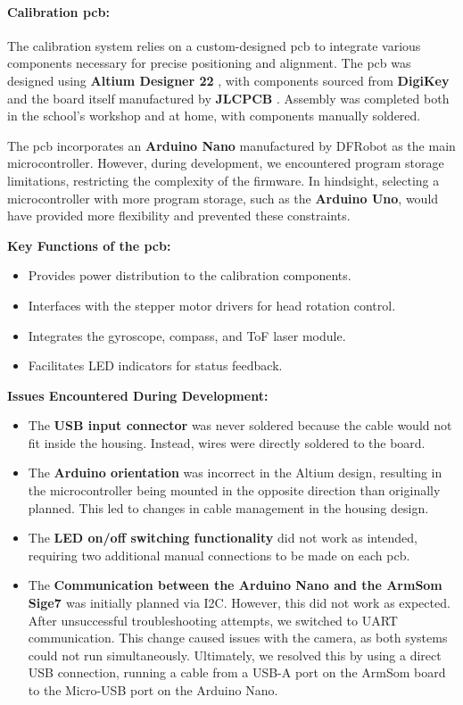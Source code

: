 \paragraph{Calibration \acrshort{pcb}:}
The calibration system relies on a custom-designed \acrshort{pcb} to integrate various components necessary for precise positioning and alignment. The \acrshort{pcb} was designed using \textbf{Altium Designer 22} \cite{altium_designer_22}, with components sourced from \textbf{DigiKey} \cite{digikey} and the board itself manufactured by \textbf{JLCPCB} \cite{jlcpcb}. Assembly was completed both in the school’s workshop and at home, with components manually soldered.

The \acrshort{pcb} incorporates an \textbf{Arduino Nano} manufactured by DFRobot \cite{arduino_nano_dfrobot} as the main microcontroller. However, during development, we encountered program storage limitations, restricting the complexity of the firmware. In hindsight, selecting a microcontroller with more program storage, such as the \textbf{Arduino Uno}, would have provided more flexibility and prevented these constraints.

\textbf{Key Functions of the \acrshort{pcb}:}
\begin{itemize}
	\item Provides power distribution to the calibration components.
	\item Interfaces with the stepper motor drivers for head rotation control.
	\item Integrates the gyroscope, compass, and ToF laser module.
	\item Facilitates LED indicators for status feedback.
\end{itemize}

\textbf{Issues Encountered During Development:}
\begin{itemize}
	\item The \textbf{USB input connector} was never soldered because the cable would not fit inside the housing. Instead, wires were directly soldered to the board.
	\item The \textbf{Arduino orientation} was incorrect in the Altium design, resulting in the microcontroller being mounted in the opposite direction than originally planned. This led to changes in cable management in the housing design.
	\item The \textbf{LED on/off switching functionality} did not work as intended, requiring two additional manual connections to be made on each \acrshort{pcb}.
	\item The \textbf{Communication between the Arduino Nano \cite{arduino_nano_dfrobot} and the ArmSom Sige7 \cite{armsom_sige7}} was initially planned via I2C. However, this did not work as expected. After unsuccessful troubleshooting attempts, we switched to UART communication. This change caused issues with the camera, as both systems could not run simultaneously. Ultimately, we resolved this by using a direct USB connection, running a cable from a USB-A port on the ArmSom board to the Micro-USB port on the Arduino Nano.
\end{itemize}

